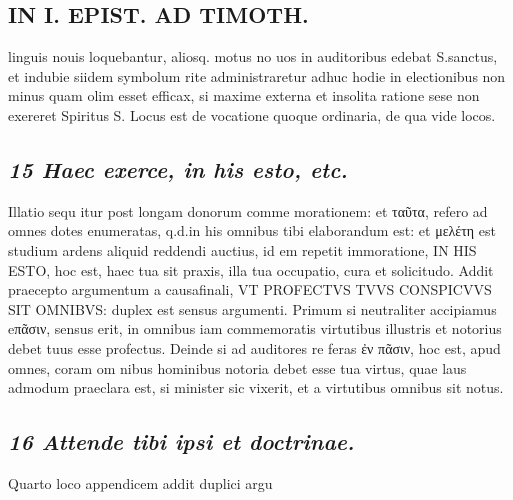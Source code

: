 \documentclass{article}
\begin{document}
\begin{pages}
\section*{IN I. EPIST. AD TIMOTH. }
\marginpar{[ p.113 ]}\pstart linguis nouis loquebantur, aliosq. motus no uos in auditoribus edebat S.sanctus, et indubie siidem symbolum rite administraretur adhuc hodie in electionibus non minus quam olim esset efficax, si maxime externa et insolita ratione sese non exereret Spiritus S. Locus est de vocatione quoque ordinaria, de qua vide locos.  \pend
{}
{}
\subsection*{\textit{15 Haec exerce, in his esto, etc. }}\pstart Illatio sequ itur post longam donorum comme morationem: et ταῦτα, refero ad omnes dotes enumeratas, q.d.in his omnibus tibi elaborandum est: et μελέτη est studium ardens aliquid reddendi auctius, id em repetit immoratione, IN HIS ESTO, hoc est, haec tua sit praxis, illa tua occupatio, cura et solicitudo. Addit praecepto argumentum a causafinali, VT PROFECTVS TVVS CONSPICVVS SIT OMNIBVS: duplex est sensus argumenti. Primum si neutraliter accipiamus eπᾶσιν, sensus erit, in omnibus iam commemoratis virtutibus illustris et notorius debet tuus esse profectus. Deinde si ad auditores re feras ἐν πᾶσιν, hoc est, apud omnes, coram om nibus hominibus notoria debet esse tua virtus, quae laus admodum praeclara est, si minister sic vixerit, et a virtutibus omnibus sit notus.  \pend
{}
{}
\subsection*{\textit{16 Attende tibi ipsi et doctrinae. }}\pstart Quarto loco appendicem addit duplici argu\pend

\end{pages}
\end{document}
